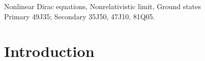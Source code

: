 \documentclass{amsart}
\theoremstyle{plain}
\theoremstyle{definition}
\theoremstyle{remark}
\numberwithin{equation}{section} \numberwithin{figure}{section}
\begin{document}
 \quad  Nonlinear Dirac equations, Nonrelativistic limit, Ground states \\
\quad Primary 49J35; Secondary 35J50, 47J10, 81Q05.

\tableofcontents

\section{Introduction}




\end{document}
